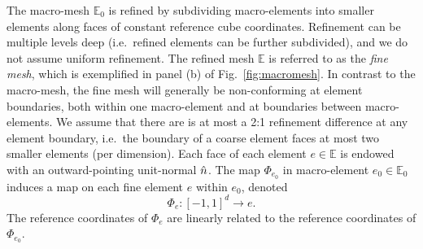 The macro-mesh $\mathbb{E}_0$ is refined by subdividing macro-elements
into smaller elements along faces of constant reference cube
  coordinates. Refinement can be multiple levels deep (i.e.\ refined
elements can be further subdivided), and we do not assume uniform
refinement.  The refined mesh $\mathbb{E}$ is referred to as the
\emph{fine mesh}, which is exemplified in panel (b) of
Fig.~\ref{fig:macromesh}.  In contrast to the macro-mesh, the fine
mesh will generally be non-conforming at element boundaries, both
within one macro-element and at boundaries between macro-elements. We
assume that there are is at most a 2:1 refinement difference at any element
boundary, i.e.\ the boundary of a coarse element faces at most two
smaller elements (per dimension). Each face of each element $e\in
\mathbb{E}$ is endowed with an outward-pointing unit-normal $\Hat n$.
The map $\Phi_{e_0}$ in macro-element $e_0\in \mathbb{E}_0$
  induces a map on each fine element $e$ within $e_0$, denoted
\begin{equation}\label{eq:Phi_e}
\Phi_e: [-1,1]^d\to e.
\end{equation}
The reference coordinates of $\Phi_e$ are
linearly related to the reference coordinates of $\Phi_{e_0}$.

